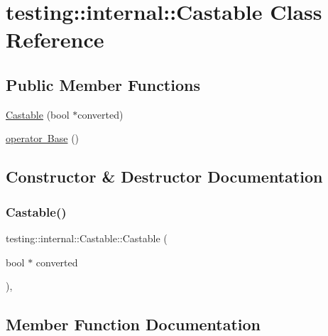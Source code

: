 \hypertarget{classtesting_1_1internal_1_1Castable}{}\section{testing\+::internal\+::Castable Class Reference}
\label{classtesting_1_1internal_1_1Castable}
\subsection*{Public Member Functions}
\begin{DoxyCompactItemize}
\item 
\mbox{\hyperlink{classtesting_1_1internal_1_1Castable_a705d519a227d38ff5c174905316f62c4}{Castable}} (bool $\ast$converted)
\item 
\mbox{\hyperlink{classtesting_1_1internal_1_1Castable_ac60b2e7885f3b09defb829eddaa0afd9}{operator Base}} ()
\end{DoxyCompactItemize}


\subsection{Constructor \& Destructor Documentation}
\mbox{\label{classtesting_1_1internal_1_1Castable_a705d519a227d38ff5c174905316f62c4}} 
\subsubsection{\texorpdfstring{Castable()}{Castable()}}
{\footnotesize\ttfamily testing\+::internal\+::\+Castable\+::\+Castable (\begin{DoxyParamCaption}\item[{bool $\ast$}]{converted }\end{DoxyParamCaption})\hspace{0.3cm}{\ttfamily [inline]}, {\ttfamily [explicit]}}



\subsection{Member Function Documentation}
\mbox{\label{classtesting_1_1internal_1_1Castable_ac60b2e7885f3b09defb829eddaa0afd9}} 
